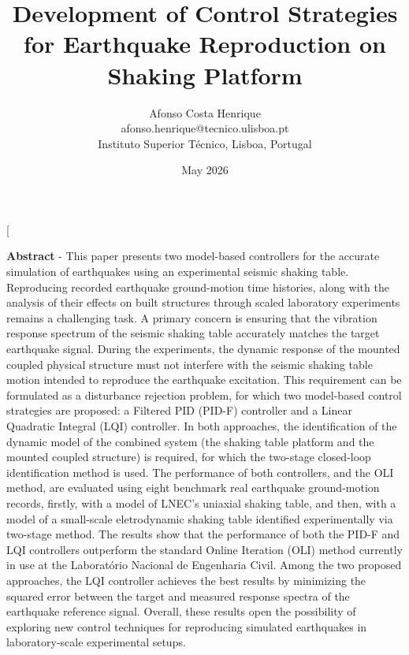 \documentclass[ 10pt, twocolumn]{article} %
\begin{document}
\twocolumn[\vspace*{-8mm}
\title{Development of Control Strategies for Earthquake Reproduction on Shaking Platform}
\date{May 2026}
\author{Afonso Costa Henrique \\ afonso.henrique@tecnico.ulisboa.pt \\ Instituto Superior Técnico, Lisboa, Portugal}
\maketitle
\vspace{-7mm}

\textbf{Abstract} - This paper presents two model-based controllers for the accurate simulation of earthquakes using an experimental seismic shaking table. Reproducing recorded earthquake ground-motion time histories, along with the analysis of their effects on built structures through scaled laboratory experiments remains a challenging task. A primary concern is ensuring that the vibration response spectrum of the seismic shaking table accurately matches the target earthquake signal. During the experiments, the dynamic response of the mounted coupled physical structure must not interfere with the seismic shaking table motion intended to reproduce the earthquake excitation. This requirement can be formulated as a disturbance rejection problem, for which two model-based control strategies are proposed: a Filtered PID (PID-F) controller and a Linear Quadratic Integral (LQI) controller. In both approaches, the identification of the dynamic model of the combined system (the shaking table platform and the mounted coupled structure) is required, for which the two-stage closed-loop identification method is used. The performance of both controllers, and the OLI method, are evaluated using eight benchmark real earthquake ground-motion records, firstly, with a model of LNEC's uniaxial shaking table, and then, with a model of a small-scale eletrodynamic shaking table  identified experimentally via two-stage method. The results show that the performance of both the PID-F and LQI controllers outperform the standard Online Iteration (OLI) method currently in use at the Laboratório Nacional de Engenharia Civil. Among the two proposed approaches, the LQI controller achieves the best results by minimizing the squared error between the target and measured response spectra of the earthquake reference signal. Overall, these results open the possibility of exploring new control techniques for reproducing simulated earthquakes in laboratory-scale experimental setups.
\end{document}
